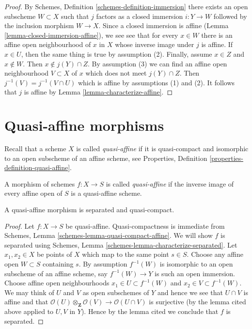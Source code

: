 \begin{proof}
By Schemes, Definition \ref{schemes-definition-immersion} there exists an
open subscheme $W \subset X$ such that $j$ factors as a closed immersion
$i : Y \to W$ followed by the inclusion morphism $W \to X$.
Since a closed immersion is affine
(Lemma \ref{lemma-closed-immersion-affine}),
we see see that for every $x \in W$ there is an affine open
neighbourhood of $x$ in $X$ whose inverse image under $j$ is affine.
If $x \in U$, then the same thing is true by assumption (2).
Finally, assume $x \in Z$ and $x \not \in W$. Then $x \not \in j(Y) \cap Z$.
By assumption (3) we can find an affine open neighbourhood
$V \subset X$ of $x$ which does not meet $j(Y) \cap Z$.
Then $j^{-1}(V) = j^{-1}(V \cap U)$ which is affine
by assumptions (1) and (2). It follows that $j$ is affine by
Lemma \ref{lemma-characterize-affine}.
\end{proof}









\section{Quasi-affine morphisms}
\label{section-quasi-affine}

\noindent
Recall that a scheme $X$ is called {\it quasi-affine} if it is quasi-compact
and isomorphic to an open subscheme of an affine scheme, see
Properties, Definition \ref{properties-definition-quasi-affine}.

\begin{definition}
\label{definition-quasi-affine}
A morphism of schemes $f : X \to S$ is called {\it quasi-affine} if the
inverse image of every affine open of $S$ is a quasi-affine scheme.
\end{definition}

\begin{lemma}
\label{lemma-quasi-affine-separated}
A quasi-affine morphism is separated and quasi-compact.
\end{lemma}

\begin{proof}
Let $f : X \to S$ be quasi-affine.
Quasi-compactness is immediate from
Schemes, Lemma \ref{schemes-lemma-quasi-compact-affine}.
We will show $f$ is separated using
Schemes, Lemma \ref{schemes-lemma-characterize-separated}. Let
$x_1, x_2 \in X$ be points of $X$ which map to the same point $s \in S$.
Choose any affine open $W \subset S$ containing $s$. By assumption
$f^{-1}(W)$ is isomorphic to an open subscheme of an affine scheme,
say $f^{-1}(W) \to Y$ is such an open immersion.
Choose affine open neighbourhoods $x_1 \in U \subset f^{-1}(W)$
and $x_2 \in V \subset f^{-1}(W)$. We may think of $U$ and $V$
as open subschemes of $Y$ and hence we see that
$U \cap V$ is affine and that
$\mathcal{O}(U) \otimes_{\mathbf{Z}} \mathcal{O}(V) \to \mathcal{O}(U \cap V)$
is surjective (by the lemma cited above applied to $U, V$ in $Y$).
Hence by the lemma cited we conclude that $f$ is separated.
\end{proof}

